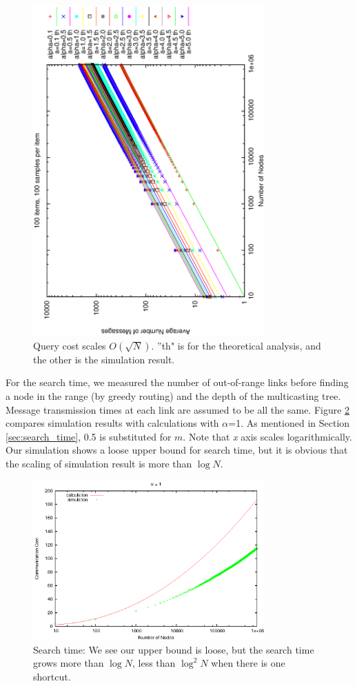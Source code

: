 \documentclass[9.5pt,journal,final,finalsubmission,twocolumn]{IEEEtran}
\begin{document}
\begin{figure}
\centering
\includegraphics[angle=270,width=3.5in]{th_hops_loglog}
\caption{Query cost scales $O(\sqrt N)$. ''th" is for the theoretical analysis, 
and the other is the simulation result.} \label{fig:cost}
\end{figure}

For the search time, we measured the number of out-of-range links before finding 
a node in the range (by greedy routing) and the depth of the multicasting tree. Message 
transmission times at each link are assumed to be all the same. Figure \ref{fig:time} %
compares simulation results with calculations with $\alpha$=1. 
As mentioned in Section \ref{sec:search_time}, 0.5 is substituted for $m$. 
Note that \textit{x} axis scales logarithmically. Our simulation shows a loose upper bound for search time, 
but it is obvious that the scaling of simulation result is more than 
$\log N$.
\begin{figure}
\centering
\includegraphics[width=3.5in]{time1}
\caption{Search time: We see our upper bound is loose, but the search time grows 
more than $\log N$, less than $\log^2 N$ when there is one shortcut.} \label{fig:time}
\end{figure}
\end{document}
